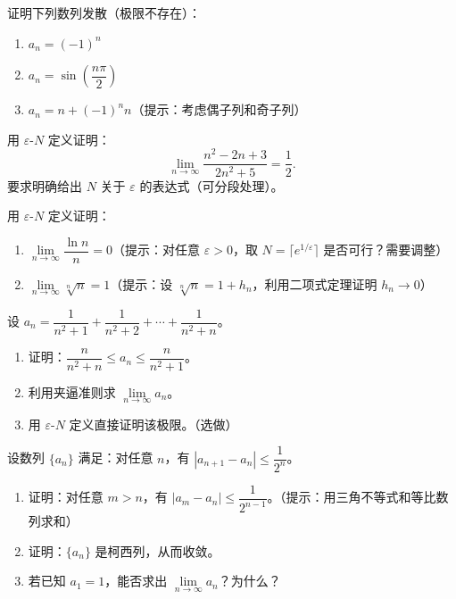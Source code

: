 \documentclass{ctexart}
\begin{document}
\begin{exercise}
证明下列数列发散（极限不存在）：
\begin{enumerate}
\item \(a_n = (-1)^n\)
\item \(a_n = \sin\left(\dfrac{n\pi}{2}\right)\)
\item \(a_n = n + (-1)^n n\)（提示：考虑偶子列和奇子列）
\end{enumerate}
\end{exercise}

\begin{exercise}
用 \(\varepsilon\)-\(N\) 定义证明：
\[
\lim_{n\to\infty} \dfrac{n^2 - 2n + 3}{2n^2 + 5} = \dfrac{1}{2}.
\]
要求明确给出 \(N\) 关于 \(\varepsilon\) 的表达式（可分段处理）。
\end{exercise}

\begin{exercise}
用 \(\varepsilon\)-\(N\) 定义证明：
\begin{enumerate}
\item \(\lim\limits_{n\to\infty} \dfrac{\ln n}{n} = 0\)（提示：对任意 \(\varepsilon > 0\)，取 \(N = \lceil e^{1/\varepsilon} \rceil\) 是否可行？需要调整）
\item \(\lim\limits_{n\to\infty} \sqrt[n]{n} = 1\)（提示：设 \(\sqrt[n]{n} = 1 + h_n\)，利用二项式定理证明 \(h_n \to 0\)）
\end{enumerate}
\end{exercise}

\begin{exercise}
设 \(a_n = \dfrac{1}{n^2 + 1} + \dfrac{1}{n^2 + 2} + \cdots + \dfrac{1}{n^2 + n}\)。
\begin{enumerate}
\item 证明：\(\dfrac{n}{n^2 + n} \leq a_n \leq \dfrac{n}{n^2 + 1}\)。
\item 利用夹逼准则求 \(\lim\limits_{n\to\infty} a_n\)。
\item 用 \(\varepsilon\)-\(N\) 定义直接证明该极限。（选做）
\end{enumerate}
\end{exercise}

\begin{exercise}[*（柯西收敛准则）]
设数列 \(\{a_n\}\) 满足：对任意 \(n\)，有 \(|a_{n+1} - a_n| \leq \dfrac{1}{2^n}\)。
\begin{enumerate}
\item 证明：对任意 \(m > n\)，有 \(|a_m - a_n| \leq \dfrac{1}{2^{n-1}}\)。（提示：用三角不等式和等比数列求和）
\item 证明：\(\{a_n\}\) 是柯西列，从而收敛。
\item 若已知 \(a_1 = 1\)，能否求出 \(\lim\limits_{n\to\infty} a_n\)？为什么？
\end{enumerate}
\end{exercise}
\end{document}
